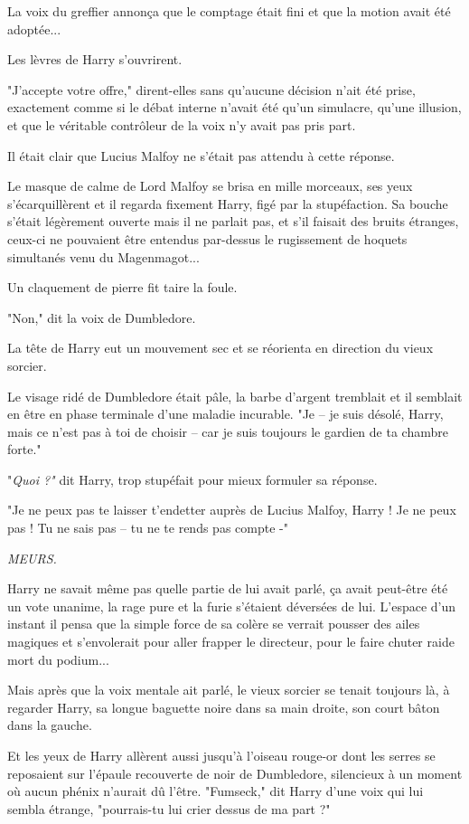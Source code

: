 La voix du greffier annonça que le comptage était fini et que la motion avait été adoptée...

Les lèvres de Harry s'ouvrirent.

"J'accepte votre offre," dirent-elles sans qu'aucune décision n'ait été prise, exactement comme si le débat interne n'avait été qu'un simulacre, qu'une illusion, et que le véritable contrôleur de la voix n'y avait pas pris part.

Il était clair que Lucius Malfoy ne s'était pas attendu à cette réponse.

Le masque de calme de Lord Malfoy se brisa en mille morceaux, ses yeux s'écarquillèrent et il regarda fixement Harry, figé par la stupéfaction. Sa bouche s'était légèrement ouverte mais il ne parlait pas, et s'il faisait des bruits étranges, ceux-ci ne pouvaient être entendus par-dessus le rugissement de hoquets simultanés venu du Magenmagot...

Un claquement de pierre fit taire la foule.

"Non," dit la voix de Dumbledore.

La tête de Harry eut un mouvement sec et se réorienta en direction du vieux sorcier.

Le visage ridé de Dumbledore était pâle, la barbe d'argent tremblait et il semblait en être en phase terminale d'une maladie incurable. "Je – je suis désolé, Harry, mais ce n'est pas à toi de choisir – car je suis toujours le gardien de ta chambre forte."

"\emph{Quoi ?"}  dit Harry, trop stupéfait pour mieux formuler sa réponse.

"Je ne peux pas te laisser t'endetter auprès de Lucius Malfoy, Harry ! Je ne peux pas ! Tu ne sais pas – tu ne te rends pas compte -"

\emph{MEURS.} 

Harry ne savait même pas quelle partie de lui avait parlé, ça avait peut-être été un vote unanime, la rage pure et la furie s'étaient déversées de lui. L'espace d'un instant il pensa que la simple force de sa colère se verrait pousser des ailes magiques et s'envolerait pour aller frapper le directeur, pour le faire chuter raide mort du podium...

Mais après que la voix mentale ait parlé, le vieux sorcier se tenait toujours là, à regarder Harry, sa longue baguette noire dans sa main droite, son court bâton dans la gauche.

Et les yeux de Harry allèrent aussi jusqu'à l'oiseau rouge-or dont les serres se reposaient sur l'épaule recouverte de noir de Dumbledore, silencieux à un moment où aucun phénix n'aurait dû l'être. "Fumseck," dit Harry d'une voix qui lui sembla étrange, "pourrais-tu lui crier dessus de ma part ?"

